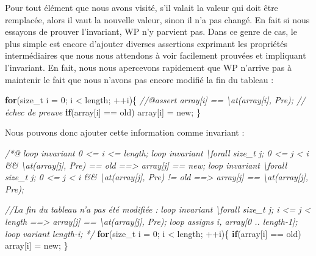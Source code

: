 \documentclass[12pt,francais,]{scrbook}
\newenvironment{Shaded}{}{}
\newcommand{\KeywordTok}[1]{\textcolor[rgb]{0.00,0.44,0.13}{\textbf{{#1}}}}
\newcommand{\DecValTok}[1]{\textcolor[rgb]{0.25,0.63,0.44}{{#1}}}
\newcommand{\CommentTok}[1]{\textcolor[rgb]{0.38,0.63,0.69}{\textit{{#1}}}}
\newcommand{\NormalTok}[1]{{#1}}
\begin{document}
Pour tout élément que nous avons visité, s'il valait la valeur qui doit
être remplacée, alors il vaut la nouvelle valeur, sinon il n'a pas
changé. En fait si nous essayons de prouver l'invariant, WP n'y parvient
pas. Dans ce genre de cas, le plus simple est encore d'ajouter diverses
assertions exprimant les propriétés intermédiaires que nous nous
attendons à voir facilement prouvées et impliquant l'invariant. En fait,
nous nous apercevons rapidement que WP n'arrive pas à maintenir le fait
que nous n'avons pas encore modifié la fin du tableau :

\begin{footnotesize}\begin{Shaded}
\begin{Highlighting}[]
\KeywordTok{for}\NormalTok{(size_t i = }\DecValTok{0}\NormalTok{; i < length; ++i)\{}
    \CommentTok{//@assert array[i] == \textbackslash{}at(array[i], Pre); // échec de preuve}
    \KeywordTok{if}\NormalTok{(array[i] == old) array[i] = new;}
\NormalTok{\}}
\end{Highlighting}
\end{Shaded}\end{footnotesize}

Nous pouvons donc ajouter cette information comme invariant :

\begin{footnotesize}\begin{Shaded}
\begin{Highlighting}[]
\CommentTok{/*@}
\CommentTok{  loop invariant 0 <= i <= length;}
\CommentTok{  loop invariant \textbackslash{}forall size_t j; 0 <= j < i && \textbackslash{}at(array[j], Pre) == old }
\CommentTok{                   ==> array[j] == new;}
\CommentTok{  loop invariant \textbackslash{}forall size_t j; 0 <= j < i && \textbackslash{}at(array[j], Pre) != old }
\CommentTok{                   ==> array[j] == \textbackslash{}at(array[j], Pre);}

\CommentTok{  //La fin du tableau n'a pas été modifiée :}
\CommentTok{  loop invariant \textbackslash{}forall size_t j; i <= j < length}
\CommentTok{                     ==> array[j] == \textbackslash{}at(array[j], Pre);}
\CommentTok{  loop assigns i, array[0 .. length-1];}
\CommentTok{  loop variant length-i;}
\CommentTok{*/}
\KeywordTok{for}\NormalTok{(size_t i = }\DecValTok{0}\NormalTok{; i < length; ++i)\{}
  \KeywordTok{if}\NormalTok{(array[i] == old) array[i] = new;}
\NormalTok{\}}
\end{Highlighting}
\end{Shaded}\end{footnotesize}
\end{document}
